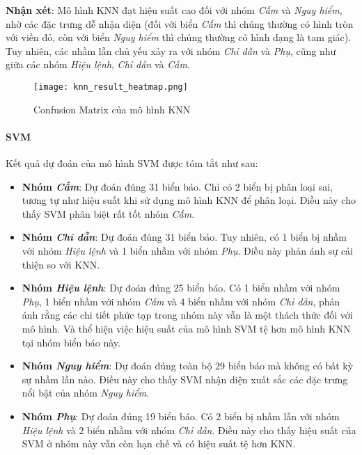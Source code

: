 \documentclass[a4paper,12pt]{article}
\begin{document}
\textbf{Nhận xét}:  
Mô hình KNN đạt hiệu suất cao đối với nhóm \textit{Cấm} và \textit{Nguy hiểm}, nhờ các đặc trưng dễ nhận diện (đối với biển \textit{Cấm} thì chúng thường có hình tròn với viền đỏ, còn với biển \textit{Nguy hiểm} thì chúng thường có hình dạng là tam giác). Tuy nhiên, các nhầm lẫn chủ yếu xảy ra với nhóm \textit{Chỉ dẫn} và \textit{Phụ}, cũng như giữa các nhóm \textit{Hiệu lệnh}, \textit{Chỉ dẫn} và \textit{Cấm}.

\begin{figure}[H]
    \centering
    \texttt{[image: knn\_result\_heatmap.png]}
    \caption{Confusion Matrix của mô hình KNN}
    \label{fig:knn_confusion_matrix}
\end{figure}

\paragraph{SVM}  
Kết quả dự đoán của mô hình SVM được tóm tắt như sau:
\begin{itemize}
    \item \textbf{Nhóm \textit{Cấm}}: Dự đoán đúng 31 biển báo. Chỉ có 2 biển bị phân loại sai, tương tự như hiệu suất khi sử dụng mô hình KNN để phân loại. Điều này cho thấy SVM phân biệt rất tốt nhóm \textit{Cấm}.
    \item \textbf{Nhóm \textit{Chỉ dẫn}}: Dự đoán đúng 31 biển báo. Tuy nhiên, có 1 biển bị nhầm với nhóm \textit{Hiệu lệnh} và 1 biển nhầm với nhóm \textit{Phụ}. Điều này phản ánh sự cải thiện so với KNN.
    \item \textbf{Nhóm \textit{Hiệu lệnh}}: Dự đoán đúng 25 biển báo. Có 1 biển nhầm với nhóm \textit{Phụ}, 1 biển nhầm với nhóm \textit{Cấm} và 4 biển nhầm với nhóm \textit{Chỉ dẫn}, phản ánh rằng các chi tiết phức tạp trong nhóm này vẫn là một thách thức đối với mô hình. Và thể hiện việc hiệu suất của mô hình SVM tệ hơn mô hình KNN tại nhóm biển báo này.
    \item \textbf{Nhóm \textit{Nguy hiểm}}: Dự đoán đúng toàn bộ 29 biển báo mà không có bất kỳ sự nhầm lẫn nào. Điều này cho thấy SVM nhận diện xuất sắc các đặc trưng nổi bật của nhóm \textit{Nguy hiểm}.
    \item \textbf{Nhóm \textit{Phụ}}: Dự đoán đúng 19 biển báo. Có 2 biển bị nhầm lẫn với nhóm \textit{Hiệu lệnh} và 2 biển nhầm với nhóm \textit{Chỉ dẫn}. Điều này cho thấy hiệu suất của SVM ở nhóm này vẫn còn hạn chế và có hiệu suất tệ hơn KNN.
\end{itemize}
\end{document}
